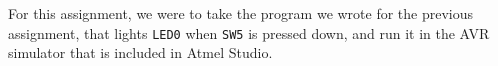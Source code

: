 For this assignment, we were to take the program we wrote for the previous assignment, that lights \texttt{LED0} when \texttt{SW5} is pressed down, and run it in the AVR simulator that is included in Atmel Studio. 
